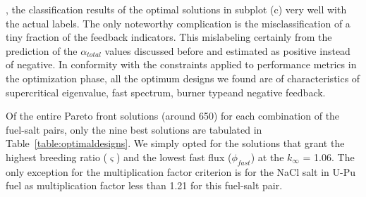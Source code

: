     \DIFdelbegin {}\DIFdelend \DIFaddbegin {}\DIFaddend , the classification results of the optimal solutions in subplot (c) \DIFdelbegin {}\DIFdelend \DIFaddbegin {}\DIFaddend very well with the actual labels. The only noteworthy complication is the misclassification of a tiny fraction of the feedback indicators. This mislabeling certainly \DIFdelbegin {}\DIFdelend \DIFaddbegin {}\DIFaddend from the prediction of the ${\alpha_{total}}$ values \DIFaddbegin {}\DIFaddend discussed before and \DIFdelbegin {}\DIFdelend \DIFaddbegin {}\DIFaddend estimated as positive instead of negative. In conformity with the constraints applied to \DIFdelbegin {}\DIFdelend performance metrics in the optimization phase, all the optimum designs we found are of characteristics of supercritical eigenvalue, fast spectrum, burner type\DIFaddbegin \DIFadd{, }\DIFaddend and negative feedback.

    Of the entire Pareto front solutions (around 650) \DIFdelbegin {}\DIFdelend \DIFaddbegin {}\DIFaddend for each combination of the fuel-salt pairs, only the nine best solutions are tabulated in Table~\ref{table:optimaldesigns}. We simply opted for the solutions that grant the highest breeding ratio ($\varsigma$) and the lowest fast flux ($\phi_{fast}$) at the $k_{\infty}$ = 1.06. The only exception for the multiplication factor criterion is for the NaCl salt in U-Pu fuel as \DIFdelbegin {}\DIFdelend \DIFaddbegin {}\DIFaddend multiplication factor less than 1.21 \DIFdelbegin {}\DIFdelend for this fuel-salt pair.

